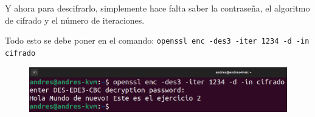 \documentclass{article}
\begin{document}
Y ahora para descifrarlo, simplemente hace falta saber la contraseña, el algoritmo de cifrado y el número de iteraciones. 

\bigskip

Todo esto se debe poner en el comando: \verb|openssl enc -des3 -iter 1234 -d -in cifrado|

\begin{figure}[H]
    \includegraphics[width=\textwidth]{imagenes/Captura desde 2022-10-19 17-54-02.png}
\end{figure}
\end{document}
